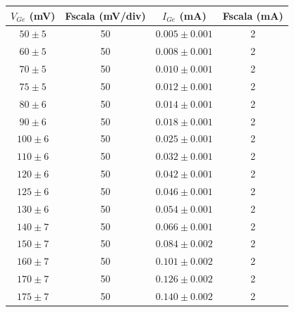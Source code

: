 \documentclass[a4paper,11pt]{article}
\begin{document}
\begin{table}[h!]
  \begin{center}
    \begin{tabular}{c|c|c|c}
      \textbf{$V_{Ge}$ (mV)}    & \textbf{Fscala (mV/div)} & \textbf{$I_{Ge}$ (mA)} & \textbf{Fscala (mA)} \\
      \hline
      $50 \pm 5$                & 50                       & $0.005 \pm 0.001$      & 2                    \\
      $60 \pm 5$                & 50                       & $0.008 \pm 0.001$      & 2                    \\
      $70 \pm 5$                & 50                       & $0.010 \pm 0.001$      & 2                    \\
      $75 \pm 5$                & 50                       & $0.012 \pm 0.001$      & 2                    \\
      $80 \pm 6$                & 50                       & $0.014 \pm 0.001$      & 2                    \\
      $90 \pm 6$                & 50                       & $0.018 \pm 0.001$      & 2                    \\
      $100 \pm 6$               & 50                       & $0.025 \pm 0.001$      & 2                    \\
      $110 \pm 6$               & 50                       & $0.032 \pm 0.001$      & 2                    \\
      $120 \pm 6$               & 50                       & $0.042 \pm 0.001$      & 2                    \\
      $125 \pm 6$               & 50                       & $0.046 \pm 0.001$      & 2                    \\
      $130 \pm 6$               & 50                       & $0.054 \pm 0.001$      & 2                    \\
      $140 \pm 7$               & 50                       & $0.066 \pm 0.001$      & 2                    \\
      $150 \pm 7$               & 50                       & $0.084 \pm 0.002$      & 2                    \\
      $160 \pm 7$               & 50                       & $0.101 \pm 0.002$      & 2                    \\
      $170 \pm 7$               & 50                       & $0.126 \pm 0.002$      & 2                    \\
      $175 \pm 7$               & 50                       & $0.140 \pm 0.002$      & 2                    \\

\end{tabular}
\end{center}
\end{table}
\end{document}
